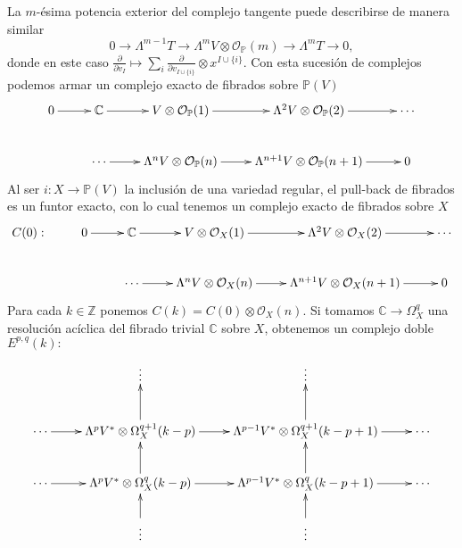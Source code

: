 \documentclass[11pt,fleqn]{article}
\newcommand\CC{\mathbb C}
\newcommand\ZZ{\mathbb Z}
\newcommand\PP{\mathbb P}
\renewcommand\O{\mathcal O}
\newcommand\ot{\otimes}
\begin{document}
La $m$-ésima potencia exterior del complejo tangente puede describirse de manera 
similar
\[
	0 \to \Lambda^{m-1} T \to \Lambda^m V \ot \O_\PP(m) \to \Lambda^m T \to 0,
\]
donde en este caso $\frac{\partial}{\partial v_I} \mapsto \sum_i 
\frac{\partial}{\partial v_{I \cup \{i\}}} \ot x^{I \cup \{i\}}$. Con esta sucesión de 
complejos podemos armar un complejo exacto de fibrados sobre $\PP(V)$
\begin{align*}
\xymatrix{
0 \ar[r]
	& \CC \ar[r] 
	& V \ot \O_\PP(1) \ar[r] 
	& \Lambda^2 V \ot \O_\PP(2) \ar[r] 
	& \cdots \\
{} 
	&\cdots \ar[r]
	& \Lambda^{n} V \ot \O_\PP(n) \ar[r]
	& \Lambda^{n+1} V \ot \O_\PP(n+1) \ar[r]
	& 0
}
\end{align*}
Al ser $i: X \to \PP(V)$ la inclusión de una variedad regular, el pull-back de fibrados
es un funtor exacto, con lo cual tenemos un complejo exacto de fibrados sobre $X$
\begin{align*}
\xymatrix{
C(0):
	& 0 \ar[r]
	& \CC \ar[r] 
	& V \ot \O_X(1) \ar[r] 
	& \Lambda^2 V \ot \O_X(2) \ar[r] 
	& \cdots \\
	& {} 
	&\cdots \ar[r]
	& \Lambda^{n} V \ot \O_X(n) \ar[r]
	& \Lambda^{n+1} V \ot \O_X(n+1) \ar[r]
	& 0
}
\end{align*}
Para cada $k \in \ZZ$ ponemos $C(k) = C(0) \ot \O_X(n)$. Si tomamos $\CC \to \Omega^q_X$ 
una resolución acíclica del fibrado trivial $\CC$ sobre $X$, obtenemos un complejo doble 
$E^{p,q}(k):$
\begin{align*}
\xymatrix{
{}
	& \vdots
	& \vdots
	& {} \\
\cdots \ar[r]
	& \Lambda^p V^* \ot \Omega_X^{q+1}(k-p) \ar[r] \ar[u]
	& \Lambda^{p-1} V^* \ot \Omega_X^{q+1}(k-p+1) \ar[r] \ar[u] 
	& \cdots \\
\cdots \ar[r]
	& \Lambda^p V^* \ot \Omega_X^{q}(k-p) \ar[r] \ar[u]
	& \Lambda^{p-1} V^* \ot \Omega_X^{q}(k-p+1) \ar[r] \ar[u] 
	& \cdots\\
{}
	& \vdots \ar[u]
	& \vdots \ar[u]
	& {} \\
}
\end{align*}
\end{document}
